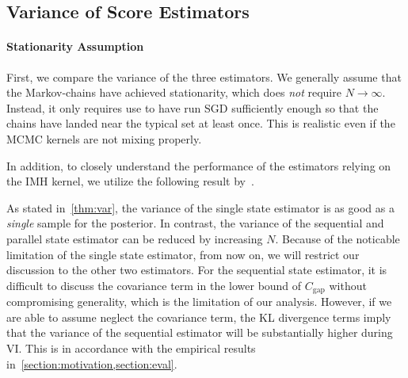 \vspace{-0.05in}
\subsection{Variance of Score Estimators}\label{section:var}
\paragraph{Stationarity Assumption}
First, we compare the variance of the three estimators.
We generally assume that the Markov-chains have achieved stationarity, which does \textit{not} require \(N \rightarrow \infty\).
Instead, it only requires use to have run SGD sufficiently enough so that the chains have landed near the typical set at least once.
This is realistic even if the MCMC kernels are not mixing properly.

In addition, to closely understand the performance of the estimators relying on the IMH kernel, we utilize the following result by~\citet{Smith96exacttransition}.


%
%


As stated in~\cref{thm:var}, the variance of the single state estimator is as good as a \textit{single} sample for the posterior.
In contrast, the variance of the sequential and parallel state estimator can be reduced by increasing \(N\).
Because of the noticable limitation of the single state estimator, from now on, we will restrict our discussion to the other two estimators.
For the sequential state estimator, it is difficult to discuss the covariance term in the lower bound of \(C_{\text{gap}}\) without compromising generality, which is the limitation of our analysis.
However, if we are able to assume neglect the covariance term, the KL divergence terms imply that the variance of the sequential estimator will be substantially higher during VI.
This is in accordance with the empirical results in~\cref{section:motivation,section:eval}.

\vspace{-0.05in}

